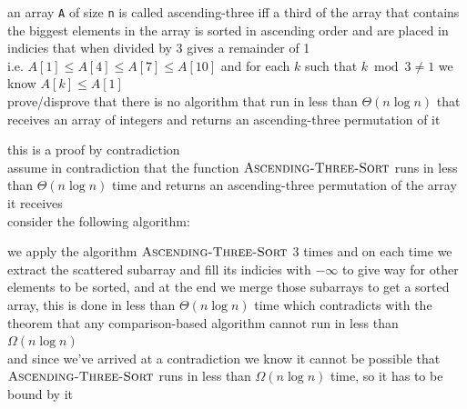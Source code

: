 \documentclass[a4paper,12pt]{article}
\begin{document}
\begin{question}
an array \texttt{A} of size \texttt{n} is called ascending-three iff a third of the array that contains the biggest elements in the array is sorted in ascending order and are placed in indicies that when divided by 3 gives a remainder of 1\\[0pt]
i.e. \(A[1] \le A[4] \le A[7] \le A[10]\) and for each \(k\) such that \(k \bmod 3 \neq 1\) we know \(A[k] \le A[1]\)\\[0pt]
prove/disprove that there is no algorithm that run in less than \(\Theta(n\log n)\) that receives an array of integers and returns an ascending-three permutation of it\\[0pt]
\begin{answer}
this is a proof by contradiction\\[0pt]
assume in contradiction that the function \(\textsc{Ascending-Three-Sort}\) runs in less than \(\Theta(n\log n)\) time and returns an ascending-three permutation of the array it receives\\[0pt]
consider the following algorithm:\\[0pt]
\begin{center}

\end{center}

we apply the algorithm \(\textsc{Ascending-Three-Sort}\) 3 times and on each time we extract the scattered subarray and fill its indicies with \(-\infty\) to give way for other elements to be sorted, and at the end we merge those subarrays to get a sorted array, this is done in less than \(\Theta(n\log n)\) time which contradicts with the theorem that any comparison-based algorithm cannot run in less than \(\Omega(n\log n)\)\\[0pt]
and since we've arrived at a contradiction we know it cannot be possible that \(\textsc{Ascending-Three-Sort}\) runs in less than \(\Omega(n\log n)\) time, so it has to be bound by it\\[0pt]
\end{answer}
\end{question}
\end{document}
